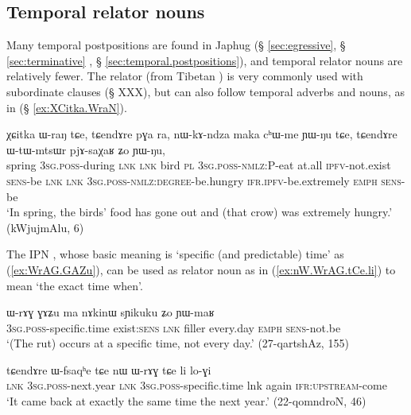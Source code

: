  
 \subsection{Temporal relator nouns} \label{sec:relator.temporal}
Many temporal postpositions are found in Japhug (§ \ref{sec:egressive}, § \ref{sec:terminative} , § \ref{sec:temporal.postpositions}), and temporal relator nouns are relatively fewer. The relator   (from Tibetan ) is very commonly used with subordinate clauses (§ XXX), but can also follow temporal adverbs and nouns, as in (§ \ref{ex:XCitka.WraN}).
 
   \begin{exe}
\ex \label{ex:XCitka.WraN} 
\gll χɕitka ɯ-raŋ tɕe, tɕendɤre pɣa ra, nɯ-kɤ-ndza maka cʰɯ-me ɲɯ-ŋu tɕe, tɕendɤre ɯ-tɯ-mtsɯr pjɤ-saχaʁ ʑo ɲɯ-ŋu,  \\
spring \textsc{3sg}.\textsc{poss}-during \textsc{lnk} \textsc{lnk} bird \textsc{pl} \textsc{3sg}.\textsc{poss}-\textsc{nmlz}:P-eat at.all \textsc{ipfv}-not.exist \textsc{sens}-be \textsc{lnk} \textsc{lnk} \textsc{3sg}.\textsc{poss}-\textsc{nmlz}:\textsc{degree}-be.hungry \textsc{ifr}.\textsc{ipfv}-be.extremely \textsc{emph} \textsc{sens}-be \\
\glt `In spring, the birds' food has gone out and (that crow) was extremely hungry.' (kWjujmAlu, 6)
\end{exe}

The IPN , whose basic meaning is `specific (and predictable) time' as (\ref{ex:WrAG.GAZu}), can be used as relator noun as in (\ref{ex:nW.WrAG.tCe.li}) to mean `the exact time when'.

\begin{exe}
\ex \label{ex:WrAG.GAZu}
\gll ɯ-rɤɣ ɣɤʑu ma nɤkinɯ sɲikuku ʑo ɲɯ-maʁ \\
\textsc{3sg}.\textsc{poss}-specific.time exist:\textsc{sens} \textsc{lnk} filler every.day \textsc{emph} \textsc{sens}-not.be \\
\glt `(The rut) occurs at a specific time, not every day.' (27-qartshAz, 155)
\end{exe}

\begin{exe}
\ex \label{ex:nW.WrAG.tCe.li}
\gll tɕendɤre ɯ-fsaqʰe tɕe nɯ ɯ-rɤɣ tɕe li lo-ɣi \\
\textsc{lnk} \textsc{3sg}.\textsc{poss}-next.year \textsc{lnk} \textsc{3sg}.\textsc{poss}-specific.time lnk again \textsc{ifr}:\textsc{upstream}-come \\
\glt `It came back at exactly the same time the next year.' (22-qomndroN, 46)
\end{exe}



